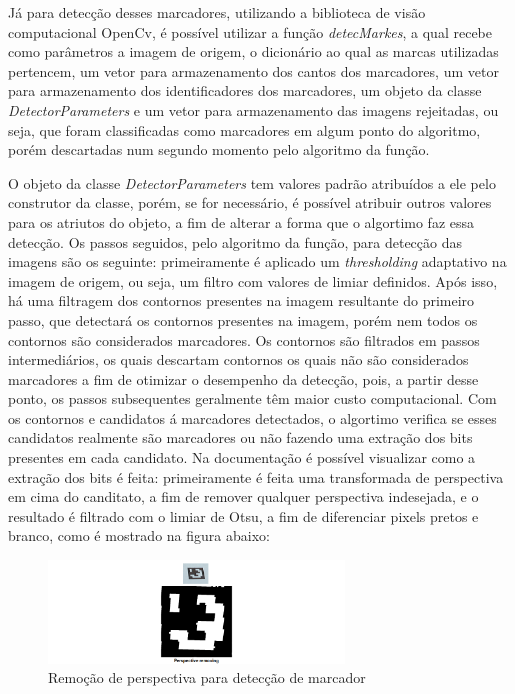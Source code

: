\documentclass[12pt]{report}
\begin{document}
{Já para detecção desses marcadores, utilizando a biblioteca de visão computacional OpenCv, é possível utilizar a função {\it detecMarkes}, a qual recebe como parâmetros a imagem de origem, o dicionário ao qual as marcas utilizadas pertencem, um vetor para armazenamento dos cantos dos marcadores, um vetor para armazenamento dos identificadores dos marcadores, um objeto da classe {\it DetectorParameters} e um vetor para armazenamento das imagens rejeitadas, ou seja, que foram classificadas como marcadores em algum ponto do algoritmo, porém descartadas num segundo momento pelo algoritmo da função.

O objeto da classe {\it DetectorParameters} tem valores padrão atribuídos a ele pelo construtor da classe, porém, se for necessário, é possível atribuir outros valores para os atriutos do objeto, a fim de alterar a forma que o algortimo faz essa detecção. Os passos seguidos, pelo algoritmo da função, para detecção das imagens são os seguinte: primeiramente é aplicado um {\it thresholding} adaptativo na imagem de origem, ou seja, um filtro com valores de limiar definidos. Após isso, há uma filtragem dos contornos presentes na imagem resultante do primeiro passo, que detectará os contornos presentes na imagem, porém nem todos os contornos são considerados marcadores. Os contornos são filtrados em passos intermediários, os quais descartam contornos os quais não são considerados marcadores a fim de otimizar o desempenho da detecção, pois, a partir desse ponto, os passos subsequentes geralmente têm maior custo computacional. Com os contornos e candidatos á marcadores detectados, o algortimo verifica se esses candidatos realmente são marcadores ou não fazendo uma extração dos bits presentes em cada candidato. Na documentação é possível visualizar como a extração dos bits é feita: primeiramente é feita uma transformada de perspectiva em cima do canditato, a fim de remover qualquer perspectiva indesejada, e o resultado é filtrado com o limiar de Otsu, a fim de diferenciar pixels pretos e branco, como é mostrado na figura abaixo:

\begin{figure}[H]
  \centering
    \includegraphics[width=0.7\textwidth]{imagens/bitsextraction.png}
    \caption{Remoção de perspectiva para detecção de marcador}
  \label{fig:bitsextraction}
\end{figure}

}
\end{document}
